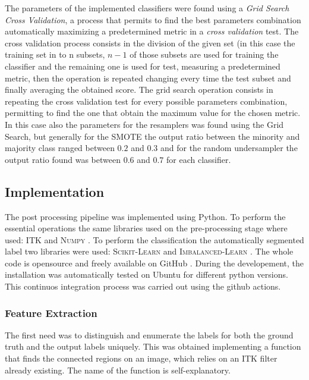 \documentclass{standalone}
\begin{document}
The parameters of the implemented classifiers were found using a \textit{Grid Search Cross Validation}, a process that permits to find the best parameters combination automatically maximizing a predetermined metric in a \textit{cross validation} test.
The cross validation process consists in the division of the given set (in this case the training set in to n subsets, $n-1$ of those subsets are used for training the classifier and the remaining one is used for test, measuring a predetermined metric, then the operation is repeated changing every time the test subset and finally averaging the obtained score.
The grid search operation consists in repeating the cross validation test for every possible parameters combination, permitting to find the one that obtain the maximum value for the chosen metric.
In this case also the parameters for the resamplers was found using the Grid Search, but generally for the SMOTE the output ratio between the minority and majority class ranged between $0.2$ and $0.3$ and for the random undersampler the output ratio found was between $0.6$ and $0.7$ for each classifier.

\subsection{Implementation}

The post processing pipeline was implemented using Python. To perform the essential operations the same libraries used on the pre-processing stage where used: \textsc{ITK} \cite{ART:ITK} and \textsc{Numpy} \cite{Numpy}.
To perform the classification the automatically segmented label two libraries were used: \textsc{Scikit-Learn} \cite{scikit-learn} and \textsc{Imbalanced-Learn} \cite{Imbalanced-Learn}.
The whole code is opensource and freely available on GitHub \cite{Neuroradiomics}.
During the developement, the installation was automatically tested on Ubuntu for
different python versions. This continuos integration process was carried out using
the github actions.

\subsubsection{Feature Extraction}

The first need was to distinguish and enumerate the labels for both the ground truth and the output labels uniquely.
This was obtained implementing a function that finds the connected regions on an image, which relies on an ITK filter already existing. The name of the function is self-explanatory.
\end{document}
